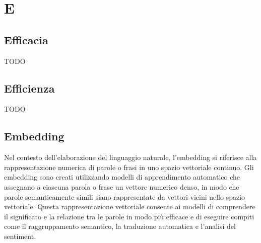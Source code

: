 \section{E}

\vspace{2em}
\subsection*{Efficacia}
TODO

\vspace{2em}
\subsection*{Efficienza}
TODO

\vspace{2em}
\subsection*{Embedding}
Nel contesto dell'elaborazione del linguaggio naturale, l'embedding si riferisce alla rappresentazione numerica di parole o frasi in uno spazio vettoriale continuo. Gli embedding sono creati utilizzando modelli di apprendimento automatico che assegnano a ciascuna parola o frase un vettore numerico denso, in modo che parole semanticamente simili siano rappresentate da vettori vicini nello spazio vettoriale. Questa rappresentazione vettoriale consente ai modelli di comprendere il significato e la relazione tra le parole in modo più efficace e di eseguire compiti come il raggruppamento semantico, la traduzione automatica e l'analisi del sentiment.
